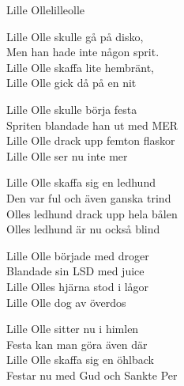 \begin{song}{Lille Olle}{lilleolle}
\begin{vers}
Lille Olle skulle gå på disko,  \\
Men han hade inte någon sprit. \\
Lille Olle skaffa lite hembränt,  \\
Lille Olle gick då på en nit\\
\end{vers}
\begin{vers}
Lille Olle skulle börja festa\\
Spriten blandade han ut med MER\\
Lille Olle drack upp femton flaskor\\
Lille Olle ser nu inte mer\\
\end{vers}
\begin{vers}
Lille Olle skaffa sig en ledhund\\
Den var ful och även ganska trind\\
Olles ledhund drack upp hela bålen\\
Olles ledhund är nu också blind\\
\end{vers}
\begin{vers}
Lille Olle började med droger\\
Blandade sin LSD med juice\\
Lille Olles hjärna stod i lågor\\
Lille Olle dog av överdos\\
\end{vers}
\begin{vers}
Lille Olle sitter nu i himlen\\
Festa kan man göra även där\\
Lille Olle skaffa sig en öhlback\\
Festar nu med Gud och Sankte Per\\
\end{vers}
\end{song}
